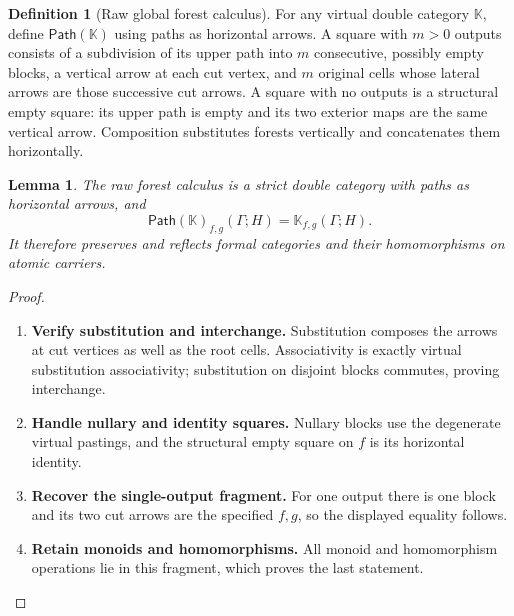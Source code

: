 \documentclass[11pt,reqno]{amsart}
\theoremstyle{plain}
\newtheorem{lemma}[theorem]{Lemma}
\theoremstyle{definition}
\newtheorem{definition}[theorem]{Definition}
\theoremstyle{remark}
\numberwithin{equation}{section}
\newcommand{\Raw}{\mathsf{Path}}
\begin{document}
\begin{definition}[Raw global forest calculus]
For any virtual double category $\mathbb K$, define $\Raw(\mathbb K)$
using paths as horizontal arrows. A square with $m>0$ outputs consists
of a subdivision of its upper path into $m$ consecutive, possibly empty
blocks, a vertical arrow at each cut vertex, and $m$ original cells
whose lateral arrows are those successive cut arrows. A square with no
outputs is a structural empty square: its upper path is empty and its
two exterior maps are the same vertical arrow. Composition substitutes
forests vertically and concatenates them horizontally.
\end{definition}

\begin{lemma}\label{lem:raw}
The raw forest calculus is a strict double category with paths as
horizontal arrows, and
\[
 \Raw(\mathbb K)_{f,g}(\Gamma;H)=\mathbb K_{f,g}(\Gamma;H).
\]
It therefore preserves and reflects formal categories and their
homomorphisms on atomic carriers.
\end{lemma}
\begin{proof}\leavevmode
\begin{enumerate}
\item \textbf{Verify substitution and interchange.} Substitution composes the arrows at cut vertices as well as the root
cells. Associativity is exactly virtual substitution associativity;
substitution on disjoint blocks commutes, proving interchange.

\item \textbf{Handle nullary and identity squares.} Nullary blocks use the degenerate virtual pastings, and the structural
empty square on $f$ is its horizontal identity.

\item \textbf{Recover the single-output fragment.} For one output there
is one block and its two cut arrows are the specified $f,g$, so the
displayed equality follows.

\item \textbf{Retain monoids and homomorphisms.} All monoid and homomorphism operations lie
in this fragment, which proves the last statement.\qedhere
\end{enumerate}
\end{proof}
\end{document}
